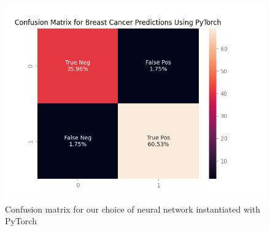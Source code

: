 \begin{figure}
    \centering
    \includegraphics[width=\linewidth]{figures/plots/logreg.png}
    \caption{Confusion matrix for our choice of neural network instantiated with PyTorch}
    \label{fig:confusionmatrix}
\end{figure}



